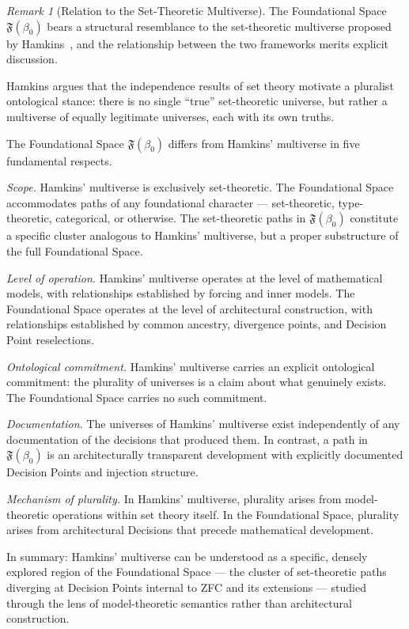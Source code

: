 \documentclass[12pt, a4paper]{article}
\theoremstyle{plain}
\theoremstyle{definition}
\theoremstyle{remark}
\newtheorem{remark}[theorem]{Remark}
\newcommand{\FS}[1]{\mathfrak{F}(#1)}
\begin{document}
\begin{remark}[Relation to the Set-Theoretic Multiverse]
\label{rem:multiverse}
The Foundational Space $\FS{\beta_0}$ bears a structural
resemblance to the set-theoretic multiverse proposed by
Hamkins~\cite{Hamkins2012}, and the relationship between the two
frameworks merits explicit discussion.

Hamkins argues that the independence results of set theory motivate
a pluralist ontological stance: there is no single ``true''
set-theoretic universe, but rather a multiverse of equally legitimate
universes, each with its own truths.

The Foundational Space $\FS{\beta_0}$ differs from Hamkins' multiverse
in five fundamental respects.

\textit{Scope.} Hamkins' multiverse is exclusively set-theoretic.
The Foundational Space accommodates paths of any foundational
character --- set-theoretic, type-theoretic, categorical, or
otherwise. The set-theoretic paths in $\FS{\beta_0}$ constitute a
specific cluster analogous to Hamkins' multiverse, but a proper
substructure of the full Foundational Space.

\textit{Level of operation.} Hamkins' multiverse operates at the
level of mathematical models, with relationships established by
forcing and inner models. The Foundational Space operates at the
level of architectural construction, with relationships established
by common ancestry, divergence points, and Decision Point
reselections.

\textit{Ontological commitment.} Hamkins' multiverse carries an
explicit ontological commitment: the plurality of universes is a
claim about what genuinely exists. The Foundational Space carries no
such commitment.

\textit{Documentation.} The universes of Hamkins' multiverse exist
independently of any documentation of the decisions that produced
them. In contrast, a path in $\FS{\beta_0}$ is an architecturally
transparent development with explicitly documented Decision Points
and injection structure.

\textit{Mechanism of plurality.} In Hamkins' multiverse, plurality
arises from model-theoretic operations within set theory itself. In
the Foundational Space, plurality arises from architectural
Decisions that precede mathematical development.

In summary: Hamkins' multiverse can be understood as a specific,
densely explored region of the Foundational Space --- the cluster
of set-theoretic paths diverging at Decision Points internal to ZFC
and its extensions --- studied through the lens of model-theoretic
semantics rather than architectural construction.
\end{remark}
\end{document}
